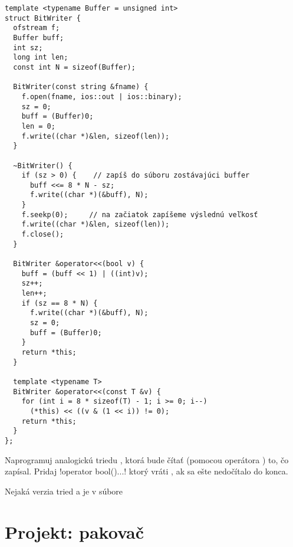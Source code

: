 \begin{lstlisting}
template <typename Buffer = unsigned int>
struct BitWriter {
  ofstream f;
  Buffer buff;
  int sz;
  long int len;
  const int N = sizeof(Buffer);

  BitWriter(const string &fname) {
    f.open(fname, ios::out | ios::binary);
    sz = 0;
    buff = (Buffer)0;
    len = 0;
    f.write((char *)&len, sizeof(len));
  }

  ~BitWriter() {
    if (sz > 0) {    // zapíš do súboru zostávajúci buffer
      buff <<= 8 * N - sz;
      f.write((char *)(&buff), N);
    }
    f.seekp(0);     // na začiatok zapíšeme výslednú veľkosť
    f.write((char *)&len, sizeof(len)); 
    f.close();
  }

  BitWriter &operator<<(bool v) {
    buff = (buff << 1) | ((int)v);
    sz++;
    len++;
    if (sz == 8 * N) {
      f.write((char *)(&buff), N);
      sz = 0;
      buff = (Buffer)0;
    }
    return *this;
  }

  template <typename T>
  BitWriter &operator<<(const T &v) {
    for (int i = 8 * sizeof(T) - 1; i >= 0; i--)
      (*this) << ((v & (1 << i)) != 0);
    return *this;
  }
};
\end{lstlisting}

\begin{uloha}
  Naprogramuj analogickú triedu , ktorá bude čítať (pomocou
  operátora \vb{>>}) to, čo  zapísal. Pridaj \prg!operator bool(){...}!
  ktorý vráti , ak sa ešte nedočítalo do konca.
\end{uloha}

Nejaká verzia tried  a  je v súbore

\section*{Projekt: pakovač}
\label{projekt.pakovac}

